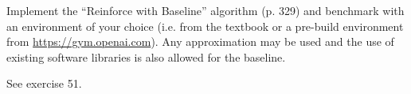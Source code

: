
\begin{exercise}

Implement the \enquote{Reinforce with Baseline} algorithm (p. 329) and benchmark with an environment of your choice (i.e. from the textbook or a pre-build environment from \href{https://gym.openai.com}{https://gym.openai.com}).
Any approximation may be used and the use of existing software libraries is also allowed for the baseline.
\end{exercise}


\begin{solution}

See exercise 51.

\end{solution}

